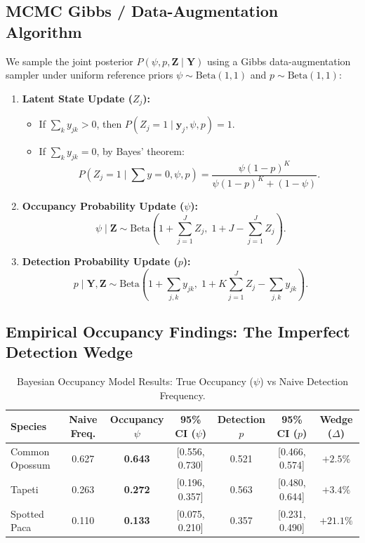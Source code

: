 \documentclass[11pt,a4paper]{article}
\begin{document}
\subsection{MCMC Gibbs / Data-Augmentation Algorithm}
We sample the joint posterior $P(\psi, p, \mathbf{Z} \mid \mathbf{Y})$ using a Gibbs data-augmentation sampler under uniform reference priors $\psi \sim \text{Beta}(1, 1)$ and $p \sim \text{Beta}(1, 1)$:
\begin{enumerate}
    \item \textbf{Latent State Update ($Z_j$):}
    \begin{itemize}
        \item If $\sum_k y_{jk} > 0$, then $P(Z_j = 1 \mid \mathbf{y}_j, \psi, p) = 1$.
        \item If $\sum_k y_{jk} = 0$, by Bayes' theorem:
        \begin{equation}
        P(Z_j = 1 \mid \sum y = 0, \psi, p) = \frac{\psi (1-p)^K}{\psi (1-p)^K + (1-\psi)}.
        \end{equation}
    \end{itemize}
    \item \textbf{Occupancy Probability Update ($\psi$):}
    \begin{equation}
    \psi \mid \mathbf{Z} \sim \text{Beta}\left(1 + \sum_{j=1}^J Z_j, \; 1 + J - \sum_{j=1}^J Z_j\right).
    \end{equation}
    \item \textbf{Detection Probability Update ($p$):}
    \begin{equation}
    p \mid \mathbf{Y}, \mathbf{Z} \sim \text{Beta}\left(1 + \sum_{j,k} y_{jk}, \; 1 + K \sum_{j=1}^J Z_j - \sum_{j,k} y_{jk}\right).
    \end{equation}
\end{enumerate}

\subsection{Empirical Occupancy Findings: The Imperfect Detection Wedge}

\begin{table}[H]
\centering
\small
\caption{Bayesian Occupancy Model Results: True Occupancy ($\psi$) vs Naive Detection Frequency.}
\label{tab:occupancy_results}
\begin{tabular}{lcccccc}
\toprule
\textbf{Species} & \textbf{Naive Freq.} & \textbf{Occupancy $\psi$} & \textbf{95\% CI ($\psi$)} & \textbf{Detection $p$} & \textbf{95\% CI ($p$)} & \textbf{Wedge ($\Delta$)} \\
\midrule
Common Opossum   & 0.627 & \textbf{0.643} & [0.556, 0.730] & 0.521 & [0.466, 0.574] & $+2.5\%$ \\
Tapeti           & 0.263 & \textbf{0.272} & [0.196, 0.357] & 0.563 & [0.480, 0.644] & $+3.4\%$ \\
Spotted Paca     & 0.110 & \textbf{0.133} & [0.075, 0.210] & 0.357 & [0.231, 0.490] & \textbf{$+21.1\%$} \\
\bottomrule
\end{tabular}
\end{table}
\end{document}
